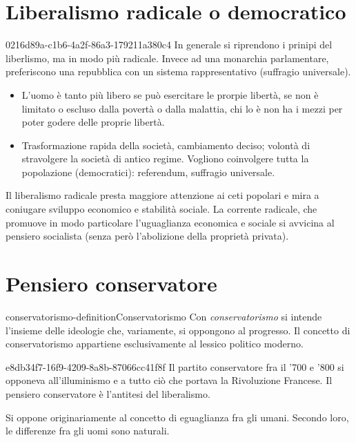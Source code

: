 \documentclass[preview]{standalone}
\begin{document}
\section{Liberalismo radicale o democratico}

\begin{snippet}{0216d89a-c1b6-4a2f-86a3-179211a380c4}
    In generale si riprendono i prinipi del liberlismo, ma in modo più radicale.
    Invece ad una monarchia parlamentare, preferiscono una repubblica con un sistema rappresentativo (suffragio universale).

    \begin{itemize}
        \item L'uomo è tanto più libero se può esercitare le prorpie libertà, se non è limitato o escluso dalla povertà o dalla malattia, chi lo è non ha i mezzi per poter godere delle proprie libertà.
        \item Trasformazione rapida della società, cambiamento deciso; volontà di stravolgere la società di antico regime. Vogliono coinvolgere tutta la popolazione (democratici): referendum, suffragio universale.
    \end{itemize}

    Il liberalismo radicale presta maggiore attenzione ai ceti popolari e mira a coniugare sviluppo
    economico e stabilità sociale. La corrente radicale, che promuove in modo particolare
    l'uguaglianza economica e sociale si avvicina al pensiero socialista (senza però l'abolizione della
    proprietà privata).
\end{snippet}

\section{Pensiero conservatore}

\begin{snippetdefinition}{conservatorismo-definition}{Conservatorismo}
    Con \textit{conservatorismo} si intende l'insieme delle ideologie che, variamente, si oppongono al progresso. Il
    concetto di conservatorismo appartiene esclusivamente al lessico politico moderno.
\end{snippetdefinition}

\begin{snippet}{e8db34f7-16f9-4209-8a8b-87066cc41f8f}
    Il partito conservatore fra il '700 e '800 si opponeva all'illuminismo e a tutto ciò che portava la Rivoluzione Francese.
    Il pensiero conservatore è l'antitesi del liberalismo.

    Si oppone originariamente al concetto di eguaglianza fra gli umani. Secondo loro, le differenze fra gli uomi sono naturali.
\end{snippet}
\end{document}
